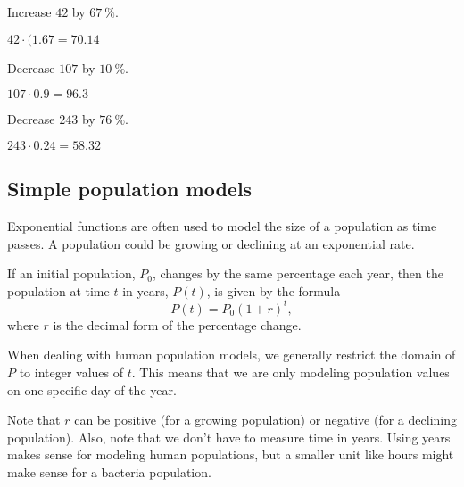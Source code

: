 \begin{essentialskills}
\begin{problem}
\begin{multicols}{2}
		\begin{subproblem}
			Increase $42$ by $\SI{67}{\percent}$. 
			\begin{shortsolution}
				$42\cdot (1.67=70.14$ 
			\end{shortsolution}
		\end{subproblem}
		\begin{subproblem}
			Decrease $107$ by $\SI{10}{\percent}$. 
			\begin{shortsolution}
				$107\cdot 0.9=96.3$ 
			\end{shortsolution}
		\end{subproblem}
		\begin{subproblem}
			Decrease $243$ by $\SI{76}{\percent}$. 
			\begin{shortsolution}
				$243\cdot 0.24=58.32$ 
			\end{shortsolution}
		\end{subproblem}
	\end{multicols}
	\end{problem}
\end{essentialskills}
			
\subsection*{Simple population models}
Exponential functions are often used to model the size of a population as time passes.  A population 
could be growing or declining at an exponential rate.
			
\begin{pccdefinition}
	If an initial population, $P_0$, changes by the same percentage each year, then 
	the population at time $t$ in years, $P(t)$, is given by the formula
	\begin{equation*}
		P(t)=P_0(1+r)^t, 
	\end{equation*}
	where $r$ is the decimal form of the percentage change.
										
	When dealing with human population models, we generally restrict the domain of $P$ to integer values of $t$. This 
	means that we are only modeling population values on one specific day of the year.
										
	Note that $r$ can be positive (for a growing population) or negative (for a declining population).  
	Also, note that we don't have to measure time in years.  Using years makes sense for modeling human populations, 
	but a smaller unit like hours might make sense for a bacteria population. 
\end{pccdefinition}
			
